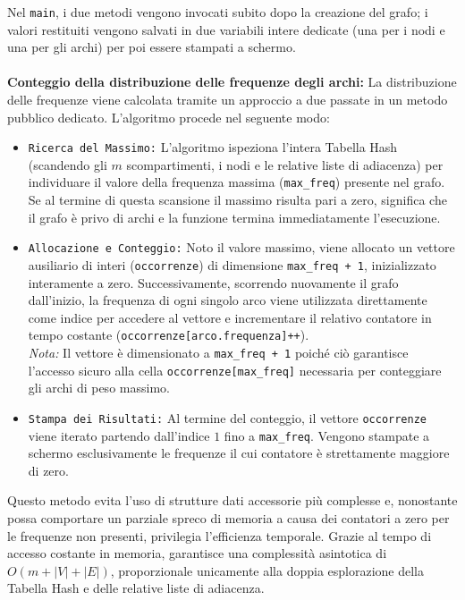 \documentclass[12pt, a4paper]{article}
\begin{document}
Nel \texttt{main}, i due metodi vengono invocati subito dopo la creazione del grafo; i valori restituiti vengono salvati in due variabili intere dedicate (una per i nodi e una per gli archi) per poi essere stampati a schermo. \\ \\
{\large\textbf{Conteggio della distribuzione delle frequenze degli archi:}} La distribuzione delle frequenze viene calcolata tramite un approccio a due passate in un metodo pubblico dedicato. L'algoritmo procede nel seguente modo:
\begin{itemize}
    \item[-] \texttt{Ricerca del Massimo:} L'algoritmo ispeziona l'intera Tabella Hash (scandendo gli $m$ scompartimenti, i nodi e le relative liste di adiacenza) per individuare il valore della frequenza massima (\texttt{max\_freq}) presente nel grafo. Se al termine di questa scansione il massimo risulta pari a zero, significa che il grafo è privo di archi e la funzione termina immediatamente l'esecuzione.
    \item[-] \texttt{Allocazione e Conteggio:} Noto il valore massimo, viene allocato un vettore ausiliario di interi (\texttt{occorrenze}) di dimensione \texttt{max\_freq + 1}, inizializzato interamente a zero. Successivamente, scorrendo nuovamente il grafo dall'inizio, la frequenza di ogni singolo arco viene utilizzata direttamente come indice per accedere al vettore e incrementare il relativo contatore in tempo costante (\texttt{occorrenze[arco.frequenza]++}). \\
    \textit{Nota:} Il vettore è dimensionato a \texttt{max\_freq + 1} poiché ciò garantisce l'accesso sicuro alla cella \texttt{occorrenze[max\_freq]} necessaria per conteggiare gli archi di peso massimo.
    \item[-] \texttt{Stampa dei Risultati:} Al termine del conteggio, il vettore \texttt{occorrenze} viene iterato partendo dall'indice $1$ fino a \texttt{max\_freq}. Vengono stampate a schermo esclusivamente le frequenze il cui contatore è strettamente maggiore di zero.
\end{itemize}
Questo metodo evita l'uso di strutture dati accessorie più complesse e, nonostante possa comportare un parziale spreco di memoria a causa dei contatori a zero per le frequenze non presenti, privilegia l'efficienza temporale. Grazie al tempo di accesso costante in memoria, garantisce una complessità asintotica di $O(m + |V| + |E|)$, proporzionale unicamente alla doppia esplorazione della Tabella Hash e delle relative liste di adiacenza. \\
\end{document}
